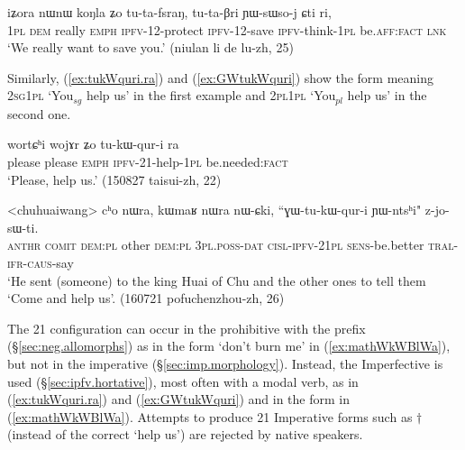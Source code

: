 \begin{exe}
\ex   \label{ex:iZora.tutafsraN}
\gll  iʑora nɯnɯ koŋla ʑo tu-ta-fsraŋ, tu-ta-βri ɲɯ-sɯso-j ɕti ri, \\
\textsc{1pl} \textsc{dem} really \textsc{emph} \textsc{ipfv}-1\fl{}2-protect \textsc{ipfv}-1\fl{}2-save \textsc{ipfv}-think-\textsc{1pl} be.\textsc{aff}:\textsc{fact} \textsc{lnk} \\ 
\glt `We really want to save you.' (niulan li de lu-zh, 25)
\end{exe}

Similarly, (\ref{ex:tukWquri.ra}) and (\ref{ex:GWtukWquri}) show the form  meaning \textsc{2sg}\fl{}\textsc{1pl} `You$_{sg}$ help us' in the first example and \textsc{2pl}\fl{}\textsc{1pl} `You$_{pl}$ help us' in the second one.

\begin{exe}
\ex   \label{ex:tukWquri.ra}
\gll   wortɕʰi wojɤr ʑo tu-kɯ-qur-i ra \\
please please \textsc{emph} \textsc{ipfv}-2\fl{}1-help-\textsc{1pl} be.needed:\textsc{fact} \\
\glt `Please, help us.' (150827 taisui-zh, 22)
\end{exe}

\begin{exe}
\ex   \label{ex:GWtukWquri}
\gll  <chuhuaiwang> cʰo nɯra, kɯmaʁ nɯra nɯ-ɕki, ``ɣɯ-tu-kɯ-qur-i ɲɯ-ntsʰi" z-jo-sɯ-ti. \\
\textsc{anthr} \textsc{comit} \textsc{dem}:\textsc{pl} other \textsc{dem}:\textsc{pl} \textsc{3pl}.\textsc{poss}-\textsc{dat} \textsc{cisl}-\textsc{ipfv}-2\fl{}\textsc{1pl} \textsc{sens}-be.better \textsc{tral}-\textsc{ifr}-\textsc{caus}-say \\
\glt `He sent (someone) to the king Huai of Chu and the other ones to tell them `Come and help us'. (160721 pofuchenzhou-zh, 26)
\end{exe}

The 2\fl{}1 configuration can occur in the prohibitive with the prefix  (§\ref{sec:neg.allomorphs}) as in the form  `don't burn me' in (\ref{ex:mathWkWBlWa}), but not in the imperative (§\ref{sec:imp.morphology}). Instead, the Imperfective is used (§\ref{sec:ipfv.hortative}), most often with a modal verb, as in (\ref{ex:tukWquri.ra}) and (\ref{ex:GWtukWquri}) and in the form  in (\ref{ex:mathWkWBlWa}). Attempts to produce 2\fl{}1 Imperative forms such as $\dagger$ (instead of the correct  `help us') are rejected by native speakers.

